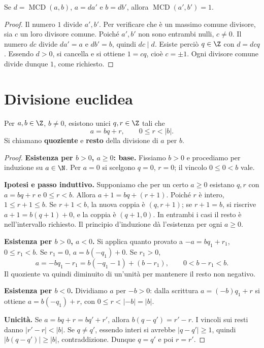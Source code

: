 \begin{proposizione}
Se $d=\operatorname{MCD}(a,b)$, $a=da'$ e $b=db'$, allora $\operatorname{MCD}(a',b')=1$.
\end{proposizione}
\begin{proof}
Il numero $1$ divide $a',b'$. Per verificare che è un massimo comune divisore, sia $c$ un loro divisore comune. Poiché $a',b'$ non sono entrambi nulli, $c\ne0$. Il numero $dc$ divide $da'=a$ e $db'=b$, quindi $dc\mid d$. Esiste perciò $q\in\Z$ con $d=dcq$. Essendo $d>0$, si cancella e si ottiene $1=cq$, cioè $c=\pm1$. Ogni divisore comune divide dunque $1$, come richiesto.
\end{proof}

\section{Divisione euclidea}
\begin{teorema}\label{teo:divisione}
Per $a,b\in\Z$, $b\ne0$, esistono unici $q,r\in\Z$ tali che
\[
a=bq+r,\qquad 0\le r<|b|.
\]
Si chiamano \textbf{quoziente} e \textbf{resto} della divisione di $a$ per $b$.
\end{teorema}
\begin{proof}
\textbf{Esistenza per $b>0$, $a\ge0$: base.} Fissiamo $b>0$ e procediamo per induzione su $a\in\N$. Per $a=0$ si scelgono $q=0$, $r=0$; il vincolo $0\le0<b$ vale.

\textbf{Ipotesi e passo induttivo.} Supponiamo che per un certo $a\ge0$ esistano $q,r$ con $a=bq+r$ e $0\le r<b$. Allora $a+1=bq+(r+1)$. Poiché $r$ è intero, $1\le r+1\le b$. Se $r+1<b$, la nuova coppia è $(q,r+1)$; se $r+1=b$, si riscrive $a+1=b(q+1)+0$, e la coppia è $(q+1,0)$. In entrambi i casi il resto è nell'intervallo richiesto. Il principio d'induzione dà l'esistenza per ogni $a\ge0$.

\textbf{Esistenza per $b>0$, $a<0$.} Si applica quanto provato a $-a=bq_1+r_1$, $0\le r_1<b$. Se $r_1=0$, $a=b(-q_1)+0$. Se $r_1>0$,
\[
a=-bq_1-r_1=b(-q_1-1)+(b-r_1),\qquad 0<b-r_1<b.
\]
Il quoziente va quindi diminuito di un'unità per mantenere il resto non negativo.

\textbf{Esistenza per $b<0$.} Dividiamo $a$ per $-b>0$: dalla scrittura $a=(-b)q_1+r$ si ottiene $a=b(-q_1)+r$, con $0\le r<|-b|=|b|$.

\textbf{Unicità.} Se $a=bq+r=bq'+r'$, allora $b(q-q')=r'-r$. I vincoli sui resti danno $|r'-r|<|b|$. Se $q\ne q'$, essendo interi si avrebbe $|q-q'|\ge1$, quindi $|b(q-q')|\ge|b|$, contraddizione. Dunque $q=q'$ e poi $r=r'$.
\end{proof}


